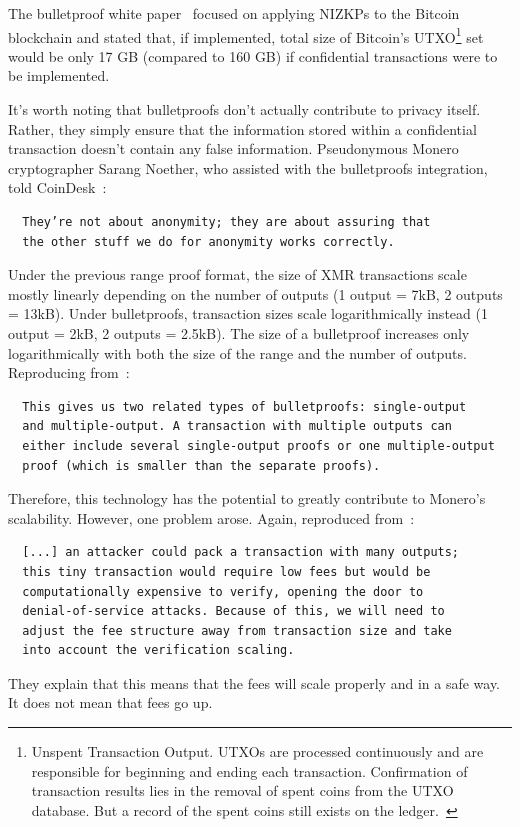 The bulletproof white paper~\cite{bulletproofs} focused on applying NIZKPs to the Bitcoin blockchain and stated that, if implemented, total size of Bitcoin’s UTXO\footnote{Unspent Transaction Output. UTXOs are processed continuously and are responsible for beginning and ending each transaction. Confirmation of transaction results lies in the removal of spent coins from the UTXO database. But a record of the spent coins still exists on the ledger.~\cite{investopedia}} set would be only 17 GB (compared to 160 GB) if confidential transactions were to be implemented.

It’s worth noting that bulletproofs don’t actually contribute to privacy itself. Rather, they simply ensure that the information stored within a confidential transaction doesn’t contain any false information. Pseudonymous Monero cryptographer Sarang Noether, who assisted with the bulletproofs integration, told CoinDesk~\cite{coindesk}:
\begin{verbatim}
  They’re not about anonymity; they are about assuring that
  the other stuff we do for anonymity works correctly.
\end{verbatim}

Under the previous range proof format, the size of XMR transactions scale mostly linearly depending on the number of outputs (1 output = 7kB, 2 outputs = 13kB). Under bulletproofs, transaction sizes scale logarithmically instead (1 output = 2kB, 2 outputs = 2.5kB). The size of a bulletproof increases only logarithmically with both the size of the range and the number of outputs. Reproducing from~\cite{getmonero}:
\begin{verbatim}
  This gives us two related types of bulletproofs: single-output
  and multiple-output. A transaction with multiple outputs can
  either include several single-output proofs or one multiple-output
  proof (which is smaller than the separate proofs).
\end{verbatim}

Therefore, this technology has the potential to greatly contribute to Monero’s scalability. However, one problem arose. Again, reproduced from~\cite{getmonero}:
\begin{verbatim}
  [...] an attacker could pack a transaction with many outputs;
  this tiny transaction would require low fees but would be
  computationally expensive to verify, opening the door to
  denial-of-service attacks. Because of this, we will need to
  adjust the fee structure away from transaction size and take
  into account the verification scaling.
\end{verbatim}
They explain that this means that the fees will scale properly and in a safe way. It does not mean that fees go up.
\pagebreak


